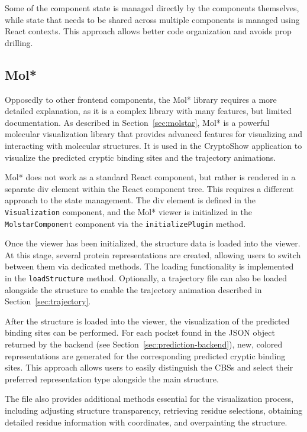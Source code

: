 Some of the component state is managed directly by the components themselves, while state that needs to be shared across multiple components is managed using React contexts. This approach allows better code organization and avoids prop drilling.


\subsection{Mol*}
\label{sec:molstar-frontend}

Opposedly to other frontend components, the Mol* library requires a more detailed explanation, as it is a complex library with many features, but limited documentation. As described in Section~\ref{sec:molstar}, Mol* is a powerful molecular visualization library that provides advanced features for visualizing and interacting with molecular structures. It is used in the CryptoShow application to visualize the predicted cryptic binding sites and the trajectory animations.

Mol* does not work as a standard React component, but rather is rendered in a separate div element within the React component tree. This requires a different approach to the state management. The div element is defined in the \lstinline|Visualization| component, and the Mol* viewer is initialized in the \lstinline|MolstarComponent| component via the \lstinline|initializePlugin| method.

Once the viewer has been initialized, the structure data is loaded into the viewer. At this stage, several protein representations are created, allowing users to switch between them via dedicated methods. The loading functionality is implemented in the \lstinline|loadStructure| method. Optionally, a trajectory file can also be loaded alongside the structure to enable the trajectory animation described in Section~\ref{sec:trajectory}.

After the structure is loaded into the viewer, the visualization of the predicted binding sites can be performed. For each pocket found in the JSON object returned by the backend (see Section~\ref{sec:prediction-backend}), new, colored representations are generated for the corresponding predicted cryptic binding sites. This approach allows users to easily distinguish the CBSs and select their preferred representation type alongside the main structure.

The file also provides additional methods essential for the visualization process, including adjusting structure transparency, retrieving residue selections, obtaining detailed residue information with coordinates, and overpainting the structure.

